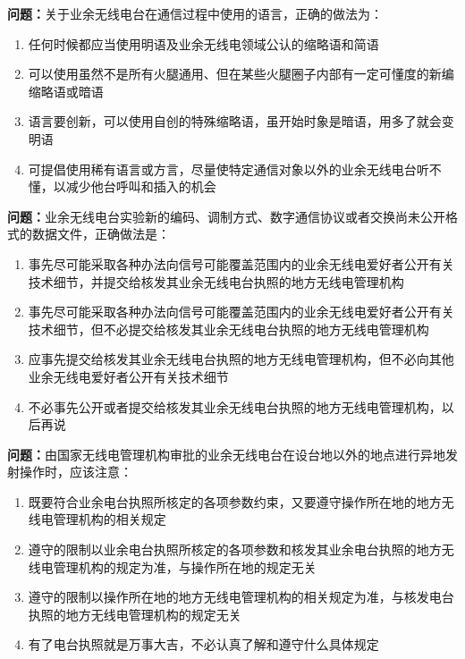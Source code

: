 \bigskip


\noindent\textbf{问题：}关于业余无线电台在通信过程中使用的语言，正确的做法为：
\begin{enumerate}[label=\Alph*), leftmargin=3em]
\item 任何时候都应当使用明语及业余无线电领域公认的缩略语和简语
\item 可以使用虽然不是所有火腿通用、但在某些火腿圈子内部有一定可懂度的新编缩略语或暗语
\item 语言要创新，可以使用自创的特殊缩略语，虽开始时象是暗语，用多了就会变明语
\item 可提倡使用稀有语言或方言，尽量使特定通信对象以外的业余无线电台听不懂，以减少他台呼叫和插入的机会
\end{enumerate}

\bigskip


\noindent\textbf{问题：}业余无线电台实验新的编码、调制方式、数字通信协议或者交换尚未公开格式的数据文件，正确做法是：
\begin{enumerate}[label=\Alph*), leftmargin=3em]
\item 事先尽可能采取各种办法向信号可能覆盖范围内的业余无线电爱好者公开有关技术细节，并提交给核发其业余无线电台执照的地方无线电管理机构
\item 事先尽可能采取各种办法向信号可能覆盖范围内的业余无线电爱好者公开有关技术细节，但不必提交给核发其业余无线电台执照的地方无线电管理机构
\item 应事先提交给核发其业余无线电台执照的地方无线电管理机构，但不必向其他业余无线电爱好者公开有关技术细节
\item 不必事先公开或者提交给核发其业余无线电台执照的地方无线电管理机构，以后再说
\end{enumerate}

\bigskip


\noindent\textbf{问题：}由国家无线电管理机构审批的业余无线电台在设台地以外的地点进行异地发射操作时，应该注意：
\begin{enumerate}[label=\Alph*), leftmargin=3em]
\item 既要符合业余电台执照所核定的各项参数约束，又要遵守操作所在地的地方无线电管理机构的相关规定
\item 遵守的限制以业余电台执照所核定的各项参数和核发其业余电台执照的地方无线电管理机构的规定为准，与操作所在地的规定无关
\item 遵守的限制以操作所在地的地方无线电管理机构的相关规定为准，与核发电台执照的地方无线电管理机构的规定无关
\item 有了电台执照就是万事大吉，不必认真了解和遵守什么具体规定
\end{enumerate}

